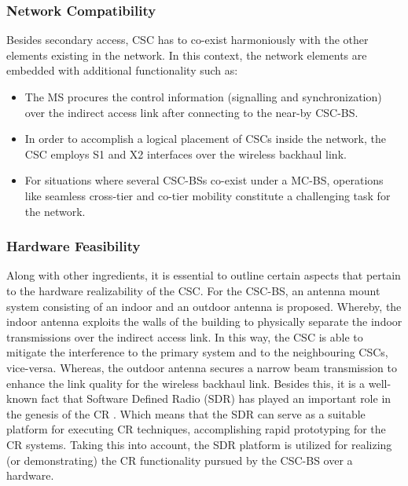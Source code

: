 \subsubsection*{Network Compatibility}
Besides secondary access, CSC has to co-exist harmoniously with the other elements existing in the network. In this context, the network elements are embedded with additional functionality such as:
\begin{itemize}
\item The MS procures the control information (signalling and synchronization) over the indirect access link after connecting to the near-by CSC-BS.
\item In order to accomplish a logical placement of CSCs inside the network, the CSC employs S1 and X2 interfaces over the wireless backhaul link.
\item For situations where several CSC-BSs co-exist under a MC-BS, operations like seamless cross-tier and co-tier mobility constitute a challenging task for the network.
\end{itemize}


\subsubsection*{Hardware Feasibility}
Along with other ingredients, it is essential to outline certain aspects that pertain to the hardware realizability of the CSC. For the CSC-BS, an antenna mount system consisting of an indoor and an outdoor antenna is proposed. Whereby, the indoor antenna exploits the walls of the building to physically separate the indoor transmissions over the indirect access link. In this way, the CSC is able to mitigate the interference to the primary system and to the neighbouring CSCs, vice-versa. Whereas, the outdoor antenna secures a narrow beam transmission to enhance the link quality for the wireless backhaul link. Besides this, it is a well-known fact that Software Defined Radio (SDR) has played an important role in the genesis of the CR \cite{Jondral05}. Which means that the SDR can serve as a suitable platform for executing CR techniques, accomplishing rapid prototyping for the CR systems. Taking this into account, the SDR platform is utilized for realizing (or demonstrating) the CR functionality pursued by the CSC-BS over a hardware.


